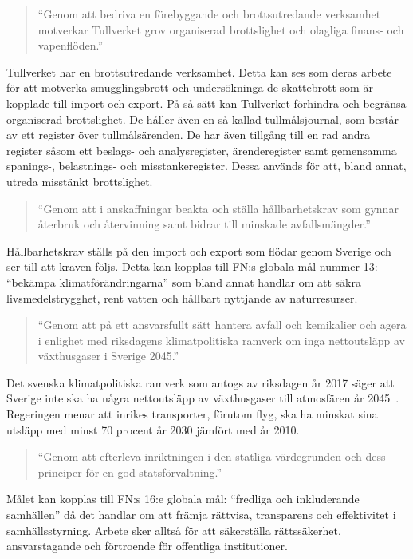 \begin{quotation}
    ``Genom att bedriva en förebyggande och brottsutredande verksamhet
    motverkar Tullverket grov organiserad brottslighet och olagliga finans-
    och vapenflöden.''
\end{quotation}

Tullverket har en brottsutredande verksamhet. Detta kan ses som deras arbete
för att motverka smugglingsbrott och undersökninga de skattebrott som är
kopplade till import och export. På så sätt kan Tullverket förhindra och
begränsa organiserad brottslighet.
%
De håller även en så kallad tullmålsjournal, som består av ett register över
tullmålsärenden. De har även tillgång till en rad andra register såsom ett
beslags- och analysregister, ärenderegister samt gemensamma spanings-,
belastnings- och misstankeregister. Dessa används för att, bland annat,
utreda misstänkt brottslighet.

\begin{quotation}
    ``Genom att i anskaffningar beakta och ställa hållbarhetskrav som gynnar
    återbruk och återvinning samt bidrar till minskade avfallsmängder.''
\end{quotation}

Hållbarhetskrav ställs på den import och export som flödar genom Sverige och
ser till att kraven följs. Detta kan kopplas till FN:s globala mål nummer 13:
``bekämpa klimatförändringarna'' som bland annat handlar om att säkra
livsmedelstrygghet, rent vatten och hållbart nyttjande av naturresurser.

\begin{quotation}
    ``Genom att på ett ansvarsfullt sätt hantera avfall och kemikalier och
    agera i enlighet med riksdagens klimatpolitiska ramverk om inga
    nettoutsläpp av växthusgaser i Sverige 2045.''
\end{quotation}

Det svenska klimatpolitiska ramverk som antogs av riksdagen år 2017 säger att
Sverige inte ska ha några nettoutsläpp av växthusgaser till atmosfären år
2045~\cite{ramverk}.
Regeringen menar att inrikes transporter, förutom flyg, ska ha minskat sina
utsläpp med minst 70 procent år 2030 jämfört med år 2010.

\begin{quotation}
    ``Genom att efterleva inriktningen i den statliga värdegrunden och dess
    principer för en god statsförvaltning.''
\end{quotation}

Målet kan kopplas till FN:s 16:e globala mål: ``fredliga och inkluderande
samhällen'' då det handlar om att främja rättvisa, transparens och effektivitet
i samhällsstyrning. Arbete sker alltså för att säkerställa rättssäkerhet,
ansvarstagande och förtroende för offentliga institutioner.

